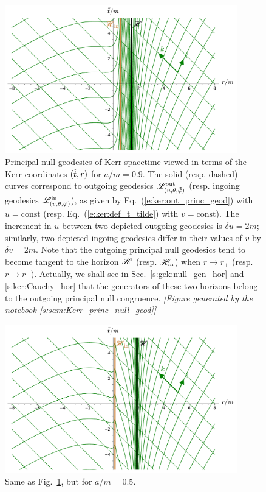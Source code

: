 \begin{figure}
\centerline{\includegraphics[width=0.9\textwidth]{ker_princ_null_geod_a90.pdf}}
\caption[]{\label{f:ker:princ_null_geod_a90} \footnotesize
Principal null geodesics of Kerr spacetime viewed in terms of the Kerr
coordinates $({\tilde t},r)$ for $a/m=0.9$. The solid (resp. dashed) curves
correspond to outgoing geodesics $\mathscr{L}^{\rm out}_{(u,\theta,\tilde{{\tilde\varphi}})}$
(resp. ingoing geodesics $\mathscr{L}^{\rm in}_{(v,\theta,{\tilde\varphi})}$), as given by
Eq.~(\ref{e:ker:out_princ_geod}) with $u=\mathrm{const}$
(resp. Eq.~(\ref{e:ker:def_t_tilde}) with $v=\mathrm{const}$). The increment
in $u$ between two depicted outgoing geodesics is $\delta u = 2m$;
similarly, two depicted ingoing geodesics differ in their values of
$v$ by $\delta v = 2m$. Note that the outgoing principal null geodesics
tend to become tangent to the horizon $\mathscr{H}$ (resp. $\mathscr{H}_{\rm in}$) when
$r\to r_+$ (resp. $r\to r_-$). Actually, we shall see in
Sec.~\ref{s:gek:null_gen_hor} and \ref{s:ker:Cauchy_hor}
that the generators of these two horizons belong to the outgoing principal null
congruence.
\textsl{[Figure generated by the notebook \ref{s:sam:Kerr_princ_null_geod}]}
}
\end{figure}

\begin{figure}
\centerline{\includegraphics[width=0.9\textwidth]{ker_princ_null_geod_a50.pdf}}
\caption[]{\label{f:ker:princ_null_geod_a50} \footnotesize
Same as Fig.~\ref{f:ker:princ_null_geod_a90}, but for $a/m=0.5$.}
\end{figure}



